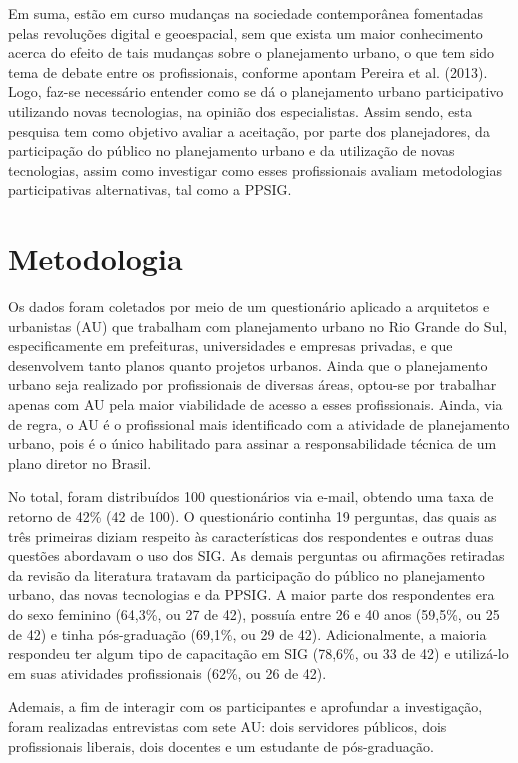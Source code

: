 \documentclass{article}
\begin{document}
Em suma, estão em curso mudanças na sociedade contemporânea fomentadas pelas
revoluções digital e geoespacial, sem que exista um maior conhecimento acerca do
efeito de tais mudanças sobre o planejamento urbano, o que tem sido tema de
debate
entre os profissionais, conforme apontam Pereira et
al. (2013). Logo, faz-se necessário entender como se dá o planejamento
urbano participativo utilizando novas tecnologias, na opinião dos especialistas.
Assim sendo, esta pesquisa tem como objetivo avaliar a aceitação, por parte dos
planejadores, da participação do público no planejamento urbano e da utilização
de
novas tecnologias, assim como investigar como esses profissionais avaliam
metodologias participativas alternativas, tal como a PPSIG.

\section{Metodologia}

Os dados foram coletados por meio de um questionário aplicado a arquitetos e
urbanistas (AU) que trabalham com planejamento urbano no Rio Grande do Sul,
especificamente em prefeituras, universidades e empresas privadas, e que
desenvolvem
tanto planos quanto projetos urbanos. Ainda que o planejamento urbano seja
realizado
por profissionais de diversas áreas, optou-se por trabalhar apenas com AU pela
maior
viabilidade de acesso a esses profissionais. Ainda, via de regra, o AU é o
profissional mais identificado com a atividade de planejamento urbano, pois é o
único habilitado para assinar a responsabilidade técnica de um plano diretor no
Brasil.

No total, foram distribuídos 100 questionários via e-mail, obtendo uma taxa de
retorno de 42\% (42 de 100). O questionário continha 19 perguntas, das quais as
três
primeiras diziam respeito às características dos respondentes e outras duas
questões
abordavam o uso dos SIG. As demais perguntas ou afirmações retiradas da revisão
da
literatura tratavam da participação do público no planejamento urbano, das novas
tecnologias e da PPSIG. A maior parte dos respondentes era do sexo feminino
(64,3\%,
ou 27 de 42), possuía entre 26 e 40 anos (59,5\%, ou 25 de 42) e tinha
pós-graduação
(69,1\%, ou 29 de 42). Adicionalmente, a maioria respondeu ter algum tipo de
capacitação em SIG (78,6\%, ou 33 de 42) e utilizá-lo em suas atividades
profissionais (62\%, ou 26 de 42).

Ademais, a fim de interagir com os participantes e aprofundar a investigação,
foram
realizadas entrevistas com sete AU: dois servidores públicos, dois profissionais
liberais, dois docentes e um estudante de pós-graduação.
\end{document}
